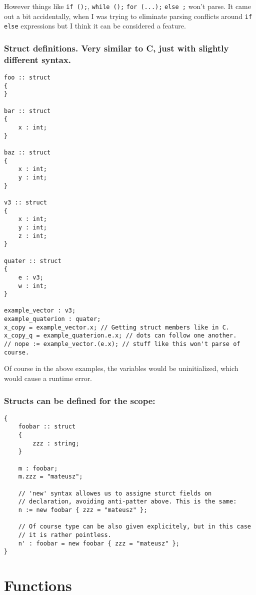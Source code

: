 \documentclass[11pt]{article}
\begin{document}
However things like \texttt{if ();}, \texttt{while ();} \texttt{for (...);}
\texttt{else ;} won't parse. It came out a bit accidentally, when I was
trying to eliminate parsing conflicts around \texttt{if else} expressions but I think
it can be considered a feature.

\subsubsection*{Struct definitions. Very similar to C, just with slightly different syntax.}
\label{sec:org380325f}
\begin{verbatim}
foo :: struct
{
}

bar :: struct
{
    x : int;
}

baz :: struct
{
    x : int;
    y : int;
}

v3 :: struct
{
    x : int;
    y : int;
    z : int;
}

quater :: struct
{
    e : v3;
    w : int;
}

example_vector : v3;
example_quaterion : quater;
x_copy = example_vector.x; // Getting struct members like in C.
x_copy_q = example_quaterion.e.x; // dots can follow one another.
// nope := example_vector.(e.x); // stuff like this won't parse of course.

\end{verbatim}

Of course in the above examples, the variables would be uninitialized, which
would cause a runtime error.

\subsubsection*{Structs can be defined for the scope:}
\label{sec:orgf1e1abe}
\begin{verbatim}
{
    foobar :: struct
    {
        zzz : string;
    }

    m : foobar;
    m.zzz = "mateusz";

    // 'new' syntax allowes us to assigne sturct fields on
    // declaration, avoiding anti-patter above. This is the same:
    n := new foobar { zzz = "mateusz" };

    // Of course type can be also given explicitely, but in this case
    // it is rather pointless.
    n' : foobar = new foobar { zzz = "mateusz" };
}
\end{verbatim}

\section*{Functions}
\label{sec:orgec4e163}
\end{document}
